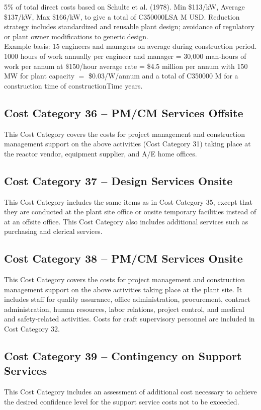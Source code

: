 5\% of total direct costs based on Schulte et al. (1978). Min \$113/kW, Average \$137/kW, Max 
\$166/kW, to give a total of C350000LSA M USD.  Reduction strategy includes standardized and reusable plant design; avoidance of regulatory or 
plant owner modifications to generic design.\\


Example basis: 15 engineers and managers on average during construction period. 
1000 hours of work annually per engineer and manager = 30,000 man-hours of work per 
annum at \$150/hour average rate = \$4.5 million per annum with 150 MW for plant capacity $=$ \$0.03/W/annum and a total of C350000 M for a construction time of constructionTime years. 


\subsection*{Cost Category 36 – PM/CM Services Offsite}
This Cost Category covers the costs for project management and construction management support on the above activities (Cost Category 31) taking place at the reactor vendor, equipment supplier, and A/E home offices.

\subsection*{Cost Category 37 – Design Services Onsite}
This Cost Category includes the same items as in Cost Category 35, except that they are conducted at the plant site office or onsite temporary facilities instead of at an offsite office. This Cost Category also includes additional services such as purchasing and clerical services.

\subsection*{Cost Category 38 – PM/CM Services Onsite}
This Cost Category covers the costs for project management and construction management support on the above activities taking place at the plant site. It includes staff for quality assurance, office administration, procurement, contract administration, human resources, labor relations, project control, and medical and safety-related activities. Costs for craft supervisory personnel are included in Cost Category 32.

\subsection*{Cost Category 39 – Contingency on Support Services}
This Cost Category includes an assessment of additional cost necessary to achieve the desired confidence level for the support service costs not to be exceeded.

